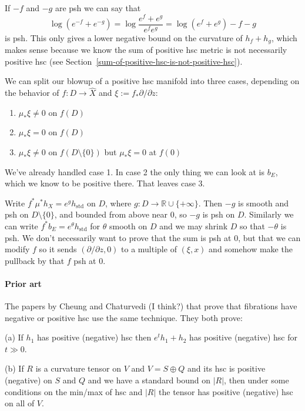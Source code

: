 \documentclass[11pt]{amsart}
\theoremstyle{definition}
\newcommand{\kk}[1]{\mathbb{#1}}
\begin{document}
If $-f$ and $-g$ are psh we can say that
$$
\log(e^{-f} + e^{-g})
= \log \frac{e^f + e^g}{e^f e^g}
= \log (e^f + e^g) - f - g
$$
is psh.
This only gives a lower negative bound on the curvature of $h_f + h_g$,
which makes sense because we know the sum of positive hsc metric is not
necessarily positive hsc (see
Section~\ref{sum-of-positive-hsc-is-not-positive-hsc}).

We can split our blowup of a positive hsc manifold into three cases, depending
on the behavior of $f : D \to \widehat X$ and $\xi := f_*\partial / \partial z$:
\begin{enumerate}
\item
$\mu_* \xi \not= 0$ on $f(D)$

\item
$\mu_* \xi = 0$ on $f(D)$

\item
$\mu_* \xi \not= 0$ on $f(D \setminus \{0\})$ but $\mu_* \xi = 0$ at $f(0)$
\end{enumerate}
We've already handled case 1.
In case 2 the only thing we can look at is $b_E$, which we know to be positive there.
That leaves case 3.

Write $f^*\mu^*h_X = e^g h_{\text{std}}$ on $D$, where $g : D \to \kk R \cup
\{+\infty\}$.
Then $-g$ is smooth and psh on $D \setminus \{0\}$, and bounded from above near
$0$, so $-g$ is psh on $D$.
Similarly we can write $f^* b_E = e^{\theta} h_{\text{std}}$ for $\theta$
smooth on $D$ and we may shrink $D$ so that $-\theta$ is psh.
We don't necessarily want to prove that the sum is psh at $0$, but that we can
modify $f$ so it sends $(\partial/\partial z, 0)$ to a multiple of $(\xi, x)$ and
somehow make the pullback by that $f$ psh at $0$.


\paragraph{Prior art}
The papers by Cheung and Chaturvedi (I think?) that prove that fibrations have
negative or positive hsc use the same technique.
They both prove:

(a) If $h_1$ has positive (negative) hsc then $e^t h_1 + h_2$ has positive
(negative) hsc for $t \gg 0$.

(b) If $R$ is a curvature tensor on $V$ and $V = S \oplus Q$ and its hsc is
positive (negative) on $S$ and $Q$ and we have a standard bound on $|R|$, then
under some conditions on the min/max of hsc and $|R|$ the tensor has positive
(negative) hsc on all of $V$.
\end{document}
